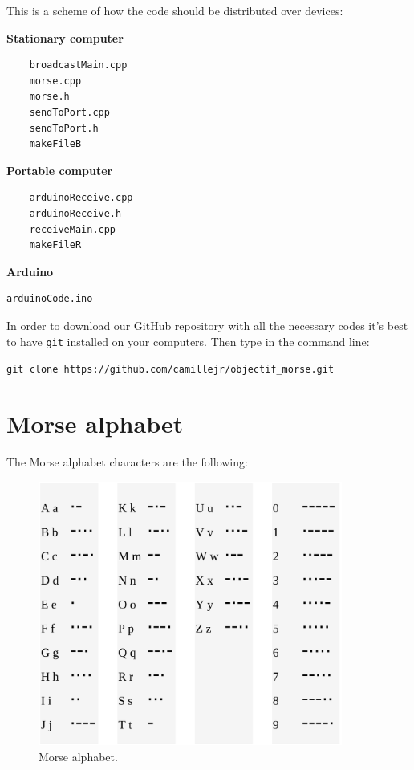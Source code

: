 \documentclass[12pt]{report}
\begin{document}
This is a scheme of how the code should be distributed over devices:

\textbf{Stationary computer}

\begin{verbatim}
	broadcastMain.cpp
	morse.cpp
	morse.h
	sendToPort.cpp
	sendToPort.h
	makeFileB
\end{verbatim}

\textbf{Portable computer}

\begin{verbatim}
	arduinoReceive.cpp
	arduinoReceive.h
	receiveMain.cpp
	makeFileR
\end{verbatim}

\textbf{Arduino}

\begin{verbatim}
arduinoCode.ino
\end{verbatim}

In order to download our GitHub repository with all the necessary codes it's best to have \verb|git| installed on your computers. Then type in the command line:

\begin{snugshade}
\verb|git clone https://github.com/camillejr/objectif_morse.git|
\end{snugshade}

\newpage

\section{Morse alphabet}  \label{sec:morse}

The Morse alphabet characters are the following:

\begin{figure}[H]
\centering\includegraphics[width=10cm]{morse_alphabet}
\caption{Morse alphabet.}			
\label{fig:morse_alphabet}
\end{figure}
\end{document}
